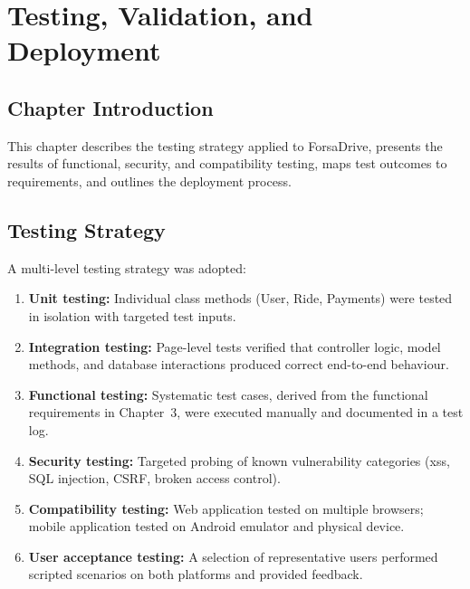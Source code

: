 \documentclass[12pt,a4paper,openright]{report}
\begin{document}
\chapter{Testing, Validation, and Deployment}

\section*{Chapter Introduction}
This chapter describes the testing strategy applied to ForsaDrive, presents the results of functional, security, and compatibility testing, maps test outcomes to requirements, and outlines the deployment process.

\section{Testing Strategy}

A multi-level testing strategy was adopted:

\begin{enumerate}[noitemsep]
    \item \textbf{Unit testing:} Individual class methods (User, Ride, Payments) were tested in isolation with targeted test inputs.
    \item \textbf{Integration testing:} Page-level tests verified that controller logic, model methods, and database interactions produced correct end-to-end behaviour.
    \item \textbf{Functional testing:} Systematic test cases, derived from the functional requirements in Chapter~3, were executed manually and documented in a test log.
    \item \textbf{Security testing:} Targeted probing of known vulnerability categories (\gls{xss}, SQL injection, CSRF, broken access control).
    \item \textbf{Compatibility testing:} Web application tested on multiple browsers; mobile application tested on Android emulator and physical device.
    \item \textbf{User acceptance testing:} A selection of representative users performed scripted scenarios on both platforms and provided feedback.
\end{enumerate}
\end{document}
